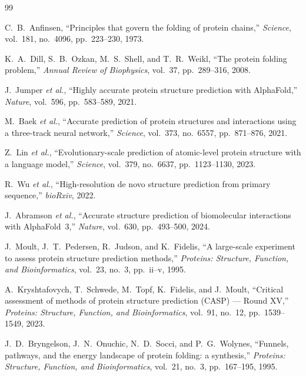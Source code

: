 \documentclass[12pt,a4paper]{article}
\theoremstyle{remark}
\begin{document}
\begin{thebibliography}{99}

C.~B.~Anfinsen,
``Principles that govern the folding of protein chains,''
\textit{Science}, vol.~181, no.~4096, pp.~223--230, 1973.

K.~A.~Dill, S.~B.~Ozkan, M.~S.~Shell, and T.~R.~Weikl,
``The protein folding problem,''
\textit{Annual Review of Biophysics}, vol.~37, pp.~289--316, 2008.

J.~Jumper \textit{et al.},
``Highly accurate protein structure prediction with AlphaFold,''
\textit{Nature}, vol.~596, pp.~583--589, 2021.

M.~Baek \textit{et al.},
``Accurate prediction of protein structures and interactions using a three-track neural network,''
\textit{Science}, vol.~373, no.~6557, pp.~871--876, 2021.

Z.~Lin \textit{et al.},
``Evolutionary-scale prediction of atomic-level protein structure with a language model,''
\textit{Science}, vol.~379, no.~6637, pp.~1123--1130, 2023.

R.~Wu \textit{et al.},
``High-resolution de novo structure prediction from primary sequence,''
\textit{bioRxiv}, 2022.

J.~Abramson \textit{et al.},
``Accurate structure prediction of biomolecular interactions with AlphaFold~3,''
\textit{Nature}, vol.~630, pp.~493--500, 2024.

J.~Moult, J.~T.~Pedersen, R.~Judson, and K.~Fidelis,
``A large-scale experiment to assess protein structure prediction methods,''
\textit{Proteins: Structure, Function, and Bioinformatics}, vol.~23, no.~3, pp.~ii--v, 1995.

A.~Kryshtafovych, T.~Schwede, M.~Topf, K.~Fidelis, and J.~Moult,
``Critical assessment of methods of protein structure prediction (CASP) — Round XV,''
\textit{Proteins: Structure, Function, and Bioinformatics}, vol.~91, no.~12, pp.~1539--1549, 2023.

J.~D.~Bryngelson, J.~N.~Onuchic, N.~D.~Socci, and P.~G.~Wolynes,
``Funnels, pathways, and the energy landscape of protein folding: a synthesis,''
\textit{Proteins: Structure, Function, and Bioinformatics}, vol.~21, no.~3, pp.~167--195, 1995.


\end{thebibliography}
\end{document}

